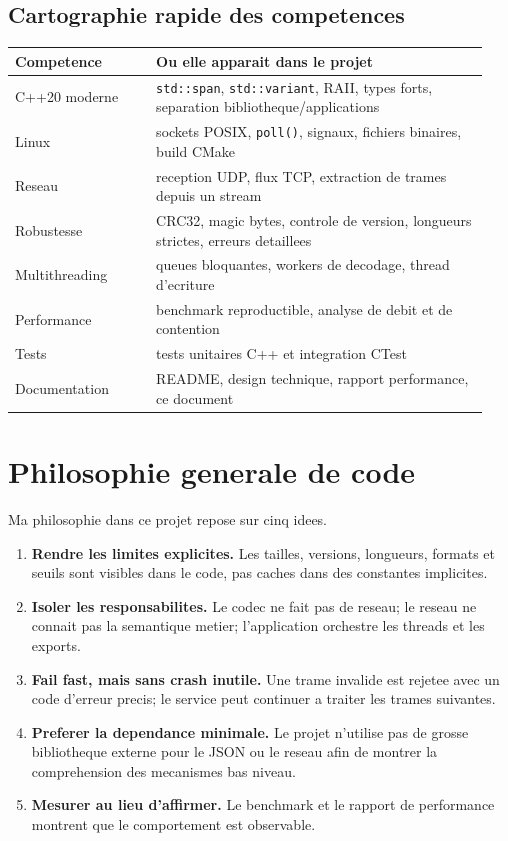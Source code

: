 \documentclass[10pt,a4paper]{article}
\begin{document}
\subsection{Cartographie rapide des competences}
\begin{longtable}{@{}p{0.28\linewidth}p{0.66\linewidth}@{}}
\toprule
Competence & Ou elle apparait dans le projet \\
\midrule
C++20 moderne & \texttt{std::span}, \texttt{std::variant}, RAII, types forts, separation bibliotheque/applications \\
Linux & sockets POSIX, \texttt{poll()}, signaux, fichiers binaires, build CMake \\
Reseau & reception UDP, flux TCP, extraction de trames depuis un stream \\
Robustesse & CRC32, magic bytes, controle de version, longueurs strictes, erreurs detaillees \\
Multithreading & queues bloquantes, workers de decodage, thread d'ecriture \\
Performance & benchmark reproductible, analyse de debit et de contention \\
Tests & tests unitaires C++ et integration CTest \\
Documentation & README, design technique, rapport performance, ce document \\
\bottomrule
\end{longtable}

\section{Philosophie generale de code}

Ma philosophie dans ce projet repose sur cinq idees.

\begin{enumerate}
  \item \textbf{Rendre les limites explicites.} Les tailles, versions, longueurs, formats et seuils sont visibles dans le code, pas caches dans des constantes implicites.
  \item \textbf{Isoler les responsabilites.} Le codec ne fait pas de reseau; le reseau ne connait pas la semantique metier; l'application orchestre les threads et les exports.
  \item \textbf{Fail fast, mais sans crash inutile.} Une trame invalide est rejetee avec un code d'erreur precis; le service peut continuer a traiter les trames suivantes.
  \item \textbf{Preferer la dependance minimale.} Le projet n'utilise pas de grosse bibliotheque externe pour le JSON ou le reseau afin de montrer la comprehension des mecanismes bas niveau.
  \item \textbf{Mesurer au lieu d'affirmer.} Le benchmark et le rapport de performance montrent que le comportement est observable.
\end{enumerate}
\end{document}
